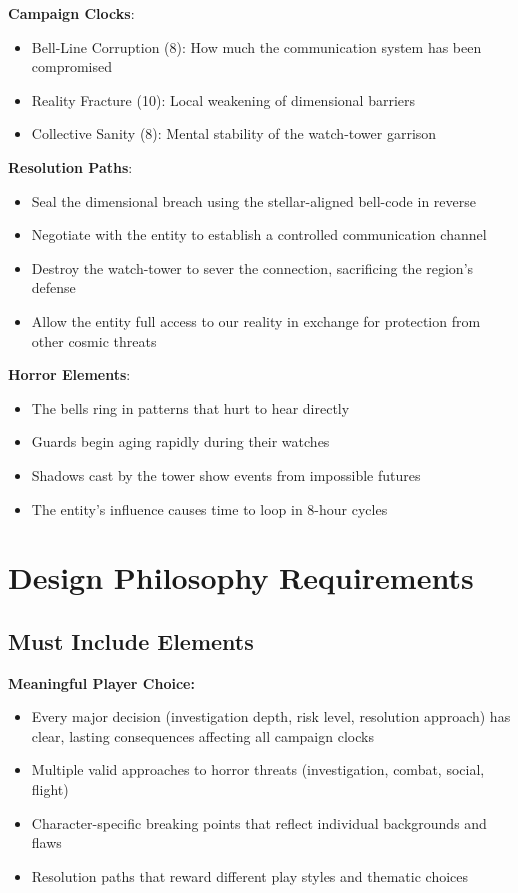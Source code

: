 \documentclass[11pt]{article}
\begin{document}
\begin{mdframed}[backgroundcolor=horrorbg]
\textbf{Campaign Clocks}:
\begin{itemize}[leftmargin=*]
\item Bell-Line Corruption (8): How much the communication system has been compromised
\item Reality Fracture (10): Local weakening of dimensional barriers
\item Collective Sanity (8): Mental stability of the watch-tower garrison
\end{itemize}

\textbf{Resolution Paths}:
\begin{itemize}[leftmargin=*]
\item Seal the dimensional breach using the stellar-aligned bell-code in reverse
\item Negotiate with the entity to establish a controlled communication channel
\item Destroy the watch-tower to sever the connection, sacrificing the region's defense
\item Allow the entity full access to our reality in exchange for protection from other cosmic threats
\end{itemize}

\textbf{Horror Elements}:
\begin{itemize}[leftmargin=*]
\item The bells ring in patterns that hurt to hear directly
\item Guards begin aging rapidly during their watches
\item Shadows cast by the tower show events from impossible futures
\item The entity's influence causes time to loop in 8-hour cycles
\end{itemize}
\end{mdframed}

\section{Design Philosophy Requirements}

\subsection{Must Include Elements}

\textbf{Meaningful Player Choice:}
\begin{itemize}
\item Every major decision (investigation depth, risk level, resolution approach) has clear, lasting consequences affecting all campaign clocks
\item Multiple valid approaches to horror threats (investigation, combat, social, flight)
\item Character-specific breaking points that reflect individual backgrounds and flaws
\item Resolution paths that reward different play styles and thematic choices
\end{itemize}
\end{document}
